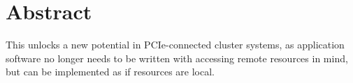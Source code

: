 \chapter{Abstract}

This unlocks a new potential in PCIe-connected cluster systems, as application software no longer needs to be written with accessing remote resources in mind, but can be implemented as if resources are local.


